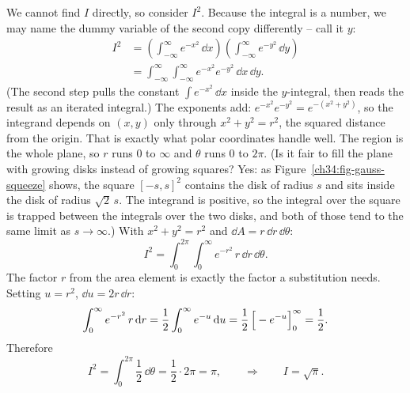 \begin{example}[$\int_{-\infty}^\infty e^{-x^2}\,\dd x=\sqrt\pi$]
\label{ch34:ex-gauss}
We cannot find $I$ directly, so consider $I^2$. Because the integral is a
number, we may name the dummy variable of the second copy differently -- call it
$y$:
\begin{align*}
  I^2 &= \left(\int_{-\infty}^\infty e^{-x^2}\,\dd x\right)
         \left(\int_{-\infty}^\infty e^{-y^2}\,\dd y\right) \\
      &= \int_{-\infty}^\infty\!\int_{-\infty}^\infty e^{-x^2}e^{-y^2}\,\dd x\,\dd y .
\end{align*}
(The second step pulls the constant $\int e^{-x^2}\,\dd x$ inside the
$y$-integral, then reads the result as an iterated integral.) The exponents add:
$e^{-x^2}e^{-y^2}=e^{-(x^2+y^2)}$, so the integrand depends on $(x,y)$ only
through $x^2+y^2=r^2$, the squared distance from the origin. That is exactly
what polar coordinates handle well.
The region is the whole plane, so $r$ runs $0$ to $\infty$ and $\theta$ runs $0$
to $2\pi$. (Is it fair to fill the plane with growing disks instead of growing
squares? Yes: as Figure~\ref{ch34:fig-gauss-squeeze} shows, the square
$[-s,s]^2$ contains the disk of radius $s$ and sits inside the disk of radius
$\sqrt2\, s$. The integrand is positive, so the integral over the square is
trapped between the integrals over the two disks, and both of those tend to the
same limit as $s\to\infty$.) With $x^2+y^2=r^2$ and $\dd A=r\,\dd r\,\dd\theta$:
\[
  I^2=\int_0^{2\pi}\!\int_0^\infty e^{-r^2}\,r\,\dd r\,\dd\theta .
\]
The factor $r$ from the area element is exactly the factor a substitution needs.
Setting $u=r^2$, $\dd u=2r\,\dd r$:
\[
  \int_0^\infty e^{-r^2}\,r\,\mathrm{d} r
  =\frac12\int_0^\infty e^{-u}\,\mathrm{d} u
  =\frac12\,\Big[-e^{-u}\Big]_{0}^{\infty}=\frac12 .
\]
Therefore
\[
  I^2=\int_0^{2\pi}\frac12\,\dd\theta=\frac12\cdot 2\pi=\pi,
  \qquad\Longrightarrow\qquad
  I=\sqrt\pi .
\]
\end{example}

